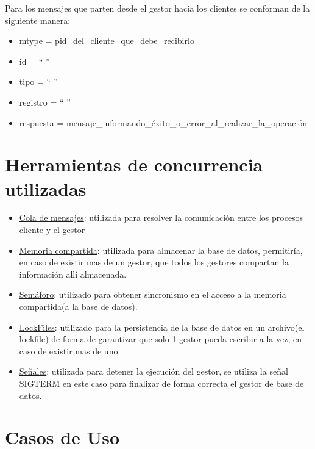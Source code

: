 \documentclass[11pt]{article}
\begin{document}
Para los mensajes que parten desde el gestor hacia los clientes se conforman de la siguiente manera:
\begin{itemize}
 \item mtype = pid\_del\_cliente\_que\_debe\_recibirlo
 \item id = `` ''
 \item tipo = `` ''
 \item registro = `` ''
 \item respuesta = mensaje\_informando\_\'exito\_o\_error\_al\_realizar\_la\_operaci\'on
\end{itemize}


\section{Herramientas de concurrencia utilizadas}
\begin{itemize}

 \item \underline{Cola de mensajes}: utilizada para resolver la comunicaci\'on entre los procesos cliente y el gestor \\
 \item \underline{Memoria compartida}: utilizada para almacenar la base de datos, permitir\'ia, en caso de existir mas de un gestor, que todos los gestores 
compartan la informaci\'on all\'i almacenada.  \\
 \item \underline{Sem\'aforo}: utilizado para obtener sincronismo en el acceso a la memoria compartida(a la base de datos). \\
 \item \underline{LockFiles}: utilizado para la persistencia de la base de datos en un archivo(el lockfile) de forma de garantizar que solo 1 gestor pueda escribir a la vez, en caso de existir mas de uno. \\
 \item \underline{Se\~nales}: utilizada para detener la ejecuci\'on del gestor, se utiliza la se\~nal SIGTERM en este caso para finalizar de forma correcta el gestor de base de datos. \\
\end{itemize}



\section{Casos de Uso}

\end{document}
